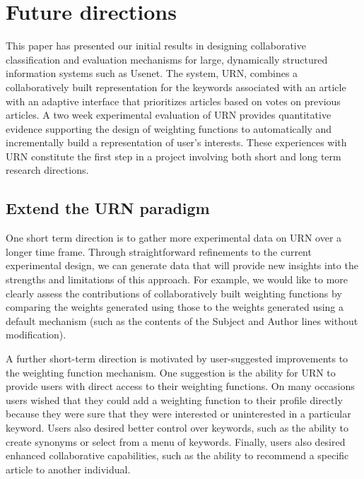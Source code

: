 

\section{Future directions}
\label{sec:conclusion}


This paper has presented our initial results in designing collaborative
classification and evaluation mechanisms for large, dynamically structured
information systems such as Usenet. The system, URN, combines a
collaboratively built representation for the keywords associated with an
article with an adaptive interface that prioritizes articles based on votes
on previous articles.  A two week experimental evaluation of URN provides
quantitative evidence supporting the design of weighting functions to
automatically and incrementally build a representation of user's interests.
These experiences with URN constitute the first step in a project involving
both short and long term research directions.

\subsection{Extend the URN paradigm}

One short term direction is to gather more experimental data on URN over a
longer time frame. Through straightforward refinements to the current
experimental design, we can generate data that will provide new insights
into the strengths and limitations of this approach.  For example, we would
like to more clearly assess the contributions of collaboratively built
weighting functions by comparing the weights generated using those to the
weights generated using a default mechanism (such as the contents of the
Subject and Author lines without modification).

A further short-term direction is motivated by user-suggested improvements
to the weighting function mechanism. One suggestion is the ability for URN
to provide users with direct access to their weighting functions. On many
occasions users wished that they could add a weighting function to their
profile directly because they were sure that they were interested or
uninterested in a particular keyword. Users also desired better control
over keywords, such as the ability to create synonyms or select from a menu
of keywords.  Finally, users also desired enhanced collaborative
capabilities, such as the ability to recommend a specific article to
another individual.

